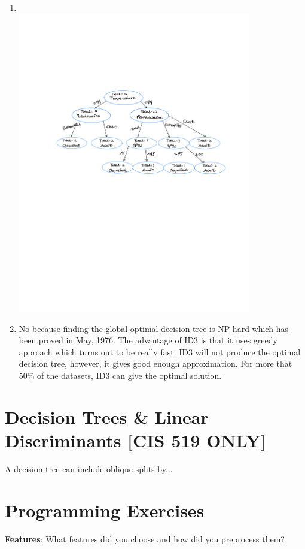 \documentclass{article}
\begin{document}
\begin{enumerate}[label=\alph*.]
            \item %
            ~\\
            
            \includegraphics[width=0.8\textwidth]{HW1_Graph1}
                        
            \item %
            No because finding the global optimal decision tree is NP hard  which has been proved in May, 1976. The advantage of ID3 is that it uses greedy approach which turns out to be really fast. ID3 will not produce the optimal decision tree, however, it gives good enough approximation. For more that 50\% of the datasets, ID3 can give the optimal solution.
        \end{enumerate}
        
       \section{Decision Trees \& Linear Discriminants [CIS 519 ONLY]}
        
        A decision tree can include oblique splits by...
        
        
        \section{Programming Exercises}
        \textbf{Features}: What features did you choose and how did you preprocess them?
        
\end{document}
